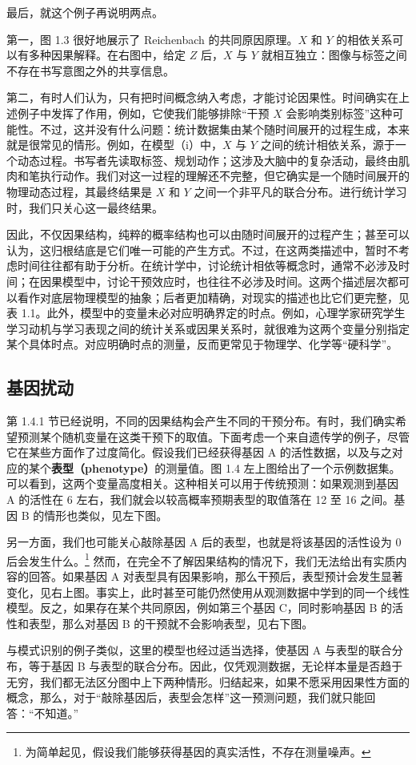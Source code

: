 最后，就这个例子再说明两点。

第一，图 1.3 很好地展示了 Reichenbach 的共同原因原理。$X$ 和 $Y$ 的相依关系可以有多种因果解释。在右图中，给定 $Z$ 后，$X$ 与 $Y$ 就相互独立：图像与标签之间不存在书写意图之外的共享信息。

第二，有时人们认为，只有把时间概念纳入考虑，才能讨论因果性。时间确实在上述例子中发挥了作用，例如，它使我们能够排除“干预 $X$ 会影响类别标签”这种可能性。不过，这并没有什么问题：统计数据集由某个随时间展开的过程生成，本来就是很常见的情形。例如，在模型（i）中，$X$ 与 $Y$ 之间的统计相依关系，源于一个动态过程。书写者先读取标签、规划动作；这涉及大脑中的复杂活动，最终由肌肉和笔执行动作。我们对这一过程的理解还不完整，但它确实是一个随时间展开的物理动态过程，其最终结果是 $X$ 和 $Y$ 之间一个非平凡的联合分布。进行统计学习时，我们只关心这一最终结果。

因此，不仅因果结构，纯粹的概率结构也可以由随时间展开的过程产生；甚至可以认为，这归根结底是它们唯一可能的产生方式。不过，在这两类描述中，暂时不考虑时间往往都有助于分析。在统计学中，讨论统计相依等概念时，通常不必涉及时间；在因果模型中，讨论干预效应时，也往往不必涉及时间。这两个描述层次都可以看作对底层物理模型的抽象；后者更加精确，对现实的描述也比它们更完整，见表 1.1。此外，模型中的变量未必对应明确界定的时点。例如，心理学家研究学生学习动机与学习表现之间的统计关系或因果关系时，就很难为这两个变量分别指定某个具体时点。对应明确时点的测量，反而更常见于物理学、化学等“硬科学”。



\FloatBarrier
\subsection{基因扰动}
\label{sec:gene-perturbation}

第 1.4.1 节已经说明，不同的因果结构会产生不同的干预分布。有时，我们确实希望预测某个随机变量在这类干预下的取值。下面考虑一个来自遗传学的例子，尽管它在某些方面作了过度简化。假设我们已经获得基因 A 的活性数据，以及与之对应的某个\textbf{表型（phenotype）}的测量值。图 1.4 左上图给出了一个示例数据集。可以看到，这两个变量高度相关。这种相关可以用于传统预测：如果观测到基因 A 的活性在 6 左右，我们就会以较高概率预期表型的取值落在 12 至 16 之间。基因 B 的情形也类似，见左下图。

另一方面，我们也可能关心敲除基因 A 后的表型，也就是将该基因的活性设为 0 后会发生什么。\footnote{为简单起见，假设我们能够获得基因的真实活性，不存在测量噪声。}
然而，在完全不了解因果结构的情况下，我们无法给出有实质内容的回答。如果基因 A 对表型具有因果影响，那么干预后，表型预计会发生显著变化，见右上图。事实上，此时甚至可能仍然使用从观测数据中学到的同一个线性模型。反之，如果存在某个共同原因，例如第三个基因 C，同时影响基因 B 的活性和表型，那么对基因 B 的干预就不会影响表型，见右下图。

与模式识别的例子类似，这里的模型也经过适当选择，使基因 A 与表型的联合分布，等于基因 B 与表型的联合分布。因此，仅凭观测数据，无论样本量是否趋于无穷，我们都无法区分图中上下两种情形。归结起来，如果不愿采用因果性方面的概念，那么，对于“敲除基因后，表型会怎样”这一预测问题，我们就只能回答：“不知道。”


\FloatBarrier
